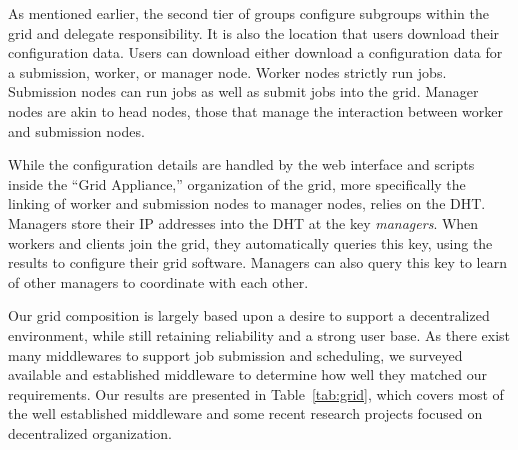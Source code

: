 \documentclass[conference]{IEEEtran}
\begin{document}
As mentioned earlier, the second tier of groups configure subgroups within the
grid and delegate responsibility.  It is also the location that users download
their configuration data.  Users can download either download a configuration
data for a submission, worker, or manager node.  Worker nodes strictly run
jobs.  Submission nodes can run jobs as well as submit jobs into the grid.
Manager nodes are akin to head nodes, those that manage the interaction between
worker and submission nodes.

While the configuration details are handled by the web interface and scripts
inside the ``Grid Appliance,'' organization of the grid, more specifically the
linking of worker and submission nodes to manager nodes, relies on the DHT.
Managers store their IP addresses into the DHT at the key \emph{managers}.
When workers and clients join the grid, they automatically queries this key,
using the results to configure their grid software.  Managers can also query
this key to learn of other managers to coordinate with each other.

Our grid composition is largely based upon a desire to support a decentralized
environment, while still retaining reliability and a strong user base.  As
there exist many middlewares to support job submission and scheduling, we
surveyed available and established middleware to determine how well they
matched our requirements.  Our results are presented in Table~\ref{tab:grid},
which covers most of the well established middleware and some recent research
projects focused on decentralized organization.
\end{document}
